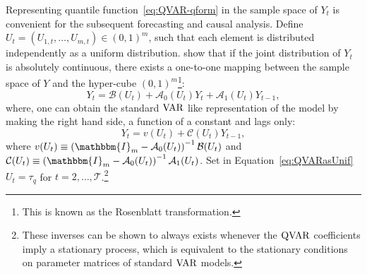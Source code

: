 %
Representing quantile function~\ref{eq:QVAR-qform} in the sample space of $Y_t$ is convenient for the subsequent forecasting and causal analysis. Define $U_t = (U_{1,t},\dotsc,U_{m,t}) \in (0,1)^m$, such that each element is distributed independently as a uniform distribution. \citet{wei2008approach} show that if the joint distribution of $Y_t$ is absolutely continuous, there exists a one-to-one mapping between the sample space of $Y$ and the hyper-cube $\left(0,1 \right)^m$\footnote{This is known as the Rosenblatt transformation.}: 
\begin{equation} \label{eq:QVARasUnif}
    Y_t = \mathcal{B}(U_t) + \mathcal{A}_0(U_t) Y_t + \mathcal{A}_1(U_t) Y_{t-1},
\end{equation}
where, one can obtain the standard $\operatorname{VAR}$ like representation of the model by making the right hand side, a  function of a constant and lags only:
\begin{equation}
    Y_t = v(U_t) + \mathcal{C}(U_t)Y_{t-1},
\end{equation}
where $v(U_t) \equiv \left( \mathbbm{I}_m - \mathcal{A}_0(U_t) \right)^{-1}\mathcal{B}(U_t)$ and $\mathcal{C}(U_t) \equiv \left( \mathbbm{I}_m - \mathcal{A}_0(U_t) \right)^{-1}\mathcal{A}_1(U_t)$. Set in Equation~\ref{eq:QVARasUnif} $U_t = \tau_q$ for $t=2,\dotsc,\mathcal{T}$.\footnote{These inverses can be shown to always exists whenever the $\operatorname{QVAR}$ coefficients imply a stationary process, which is equivalent to the stationary conditions on parameter matrices of standard $\operatorname{VAR}$ models.} %
% 

